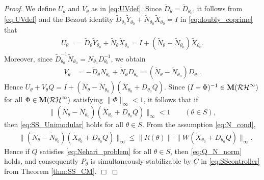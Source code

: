 \documentclass[letterpaper, 12pt, draftcls, onecolumn]{ieeeconf}
\begin{document}
\begin{proof}
	We define $U_{\theta}$ and $V_{\theta}$ as in
	\eqref{eq:UVdef}. Since $\tilde D_\theta = \tilde D_{\theta_0}$, 
	it follows from \eqref{eq:UVdef} and
	the Bezout identity $\tilde D_{\theta_0}
	\tilde Y_{\theta_0}+\tilde N_{\theta_0}\tilde X_{\theta_0} = I$ 
	in \eqref{eq:doubly_coprime} that
	\begin{align*}
	U_{\theta} 
	&= \tilde D_{\theta} \tilde Y_{\theta_0} 
	+ \tilde N_{\theta} \tilde X_{\theta_0} 
= I + (\tilde N_{\theta} - \tilde N_{\theta_0}) \tilde X_{\theta_0}.
	\end{align*}
	Moreover, since $\tilde D_{\theta_0}^{-1} \tilde N_{\theta_0} 
	= N_{\theta_0} D_{\theta_0}^{-1}$, we obtain
	\begin{align*}
	V_{\theta}
	&= -\tilde D_{\theta} N_{\theta_0} + \tilde N_{\theta} D_{\theta_0} 
= (\tilde N_{\theta} - \tilde N_{\theta_0}) D_{\theta_0}.
	\end{align*}
	Hence 
	$
	U_{\theta} + V_{\theta}Q
	=
	I +  
	(\tilde N_{\theta} - \tilde N_{\theta_0})
	(\tilde X_{\theta_0} + D_{\theta_0}Q).
	$
	Since $(I+\Phi)^{-1} \in \bf{M}(\mathcal{RH}^{\infty})$ for all
	$\Phi \in \bf{M}(\mathcal{RH}^{\infty})$ satisfying $\|\Phi\|_{\infty} < 1$,
	it follows that
	if
	\begin{equation}
	\label{eq:Q_N_norm}
	\|	(\tilde N_{\theta} - \tilde N_{\theta_0})
	(\tilde X_{\theta_0} + D_{\theta_0}Q)\|_{\infty} < 1
	\qquad (\theta \in S),
	\end{equation}
	then \eqref{eq:SS_Unimodular} holds for all $\theta \in S$. 
	From the assumption \eqref{eq:N_cond}, 
	\begin{align*}
	&\|	(\tilde N_{\theta} - \tilde N_{\theta_0})
	(\tilde X_{\theta_0} + D_{\theta_0}Q) \|_{\infty} 
	\leq 
	\|R(\theta)\| \cdot
	\|	W
	(\tilde X_{\theta_0} + D_{\theta_0}Q) \|_{\infty}.
	\end{align*}
	Hence if $Q$ satisfies \eqref{eq:Nehari_problem} 
	for all $\theta \in S$,
	then 
	\eqref{eq:Q_N_norm} holds, and consequently
	$P_{\theta}$
	is simultaneously stabilizable by $C$ in \eqref{eq:SScontroller}
	from Theorem \ref{thm:SS_CM}.
	\hspace*{\fill} $\Box$ 
\end{proof}
\end{document}
